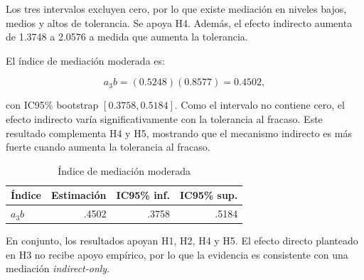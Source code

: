 \documentclass[12pt,letterpaper]{article}
\begin{document}
Los tres intervalos excluyen cero, por lo que existe mediación en niveles bajos, medios y altos de tolerancia. Se apoya H4. Además, el efecto indirecto aumenta de 1.3748 a 2.0576 a medida que aumenta la tolerancia.

El índice de mediación moderada es:

\[
a_3b=(0.5248)(0.8577)=0.4502,
\]

con IC95\% bootstrap $[0.3758,0.5184]$. Como el intervalo no contiene cero, el efecto indirecto varía significativamente con la tolerancia al fracaso. Este resultado complementa H4 y H5, mostrando que el mecanismo indirecto es más fuerte cuando aumenta la tolerancia al fracaso.


\begin{table}[H]
\centering
\caption{Índice de mediación moderada}
\label{tab:p1-indice}
\begin{tabular}{lrrr}
\toprule
Índice & Estimación & IC95\% inf. & IC95\% sup. \\
\midrule
$a_3b$ & .4502 & .3758 & .5184 \\
\bottomrule
\end{tabular}
\end{table}


\begin{table}[H]
\centering
\caption{Resumen final de hipótesis de la Pregunta 1}
\label{tab:p1-resumen-hipotesis}
\end{table}

En conjunto, los resultados apoyan H1, H2, H4 y H5. El efecto directo planteado en H3 no recibe apoyo empírico, por lo que la evidencia es consistente con una mediación \textit{indirect-only}.
\end{document}
